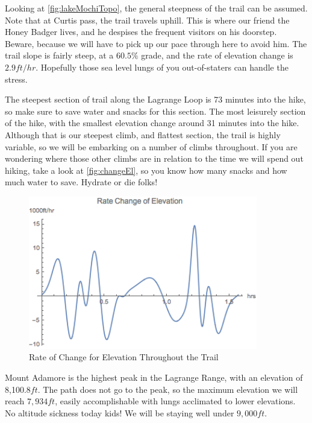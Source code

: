 \documentclass[12pt]{article}   %
\theoremstyle{definition}
\numberwithin{equation}{section}
\begin{document}
\newpage

\quad Looking at \autoref{fig:lakeMochiTopo}, the general steepness of the trail can be assumed. Note that at Curtis pass, the trail travels uphill. This is where our friend the Honey Badger lives, and he despises the frequent visitors on his doorstep. Beware, because we will have to pick up our pace through here to avoid him. The trail slope is fairly steep, at a $60.5\%$ grade, and the rate of elevation change is $2.9ft/hr$. Hopefully those sea level lungs of you out-of-staters can handle the stress.



\quad The steepest section of trail along the Lagrange Loop is 73 minutes into the hike, so make sure to save water and snacks for this section. The most leisurely section of the hike, with the smallest elevation change around 31 minutes into the hike.
\quad Although that is our steepest climb, and flattest section, the trail is highly variable, so we will be embarking on a number of climbs throughout. If you are wondering where those other climbs are in relation to the time we will spend out hiking, take a look at \autoref{fig:changeEl}, so you know how many snacks and how much water to save. Hydrate or die folks!

\begin{figure} [h]
  \centering
  \includegraphics[width=10cm]{../images/changeEl.png}
  \caption{Rate of Change for Elevation Throughout the Trail}
  \label{fig:changeEl}
\end{figure}

\quad Mount Adamore is the highest peak in the Lagrange Range, with an elevation of 8,100.8$ft$. The path does not go to the peak, so the maximum elevation we will reach $7,934ft$, easily accomplishable with lungs acclimated to lower elevations. No altitude sickness today kids! We will be staying well under $9,000ft$.
\end{document}
